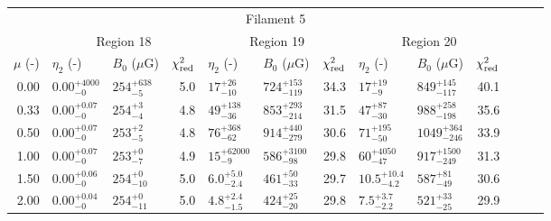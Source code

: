 \begin{tabular}{@{}r llr llr llr llr@{}}
\midrule
\multicolumn{13}{c}{Filament 5} \\
\cmidrule{1-13}
{} & \multicolumn{3}{c}{Region 18}
   & \multicolumn{3}{c}{Region 19}
   & \multicolumn{3}{c}{Region 20} \\
\cmidrule(lr){2-4} \cmidrule(lr){5-7} \cmidrule(lr){8-10}
$\mu$ (-) & $\eta_2$ (-) & $B_0$ ($\mu$G) & $\chi^2_{\mathrm{red}}$
          & $\eta_2$ (-) & $B_0$ ($\mu$G) & $\chi^2_{\mathrm{red}}$
          & $\eta_2$ (-) & $B_0$ ($\mu$G) & $\chi^2_{\mathrm{red}}$ \\
\cmidrule{1-10}
0.00 & ${0.00}^{+4000}_{-0}$ & ${254}^{+638}_{-5}$ & 5.0
     & ${17}^{+26}_{-10}$ & ${724}^{+153}_{-119}$ & 34.3
     & ${17}^{+19}_{-9}$ & ${849}^{+145}_{-117}$ & 40.1 \\
0.33 & ${0.00}^{+0.07}_{-0}$ & ${254}^{+3}_{-4}$ & 4.8
     & ${49}^{+138}_{-36}$ & ${853}^{+293}_{-214}$ & 31.5
     & ${47}^{+87}_{-30}$ & ${988}^{+258}_{-198}$ & 35.6 \\
0.50 & ${0.00}^{+0.07}_{-0}$ & ${253}^{+2}_{-5}$ & 4.8
     & ${76}^{+368}_{-62}$ & ${914}^{+440}_{-279}$ & 30.6
     & ${71}^{+195}_{-50}$ & ${1049}^{+364}_{-246}$ & 33.9 \\
1.00 & ${0.00}^{+0.07}_{-0}$ & ${253}^{+0}_{-7}$ & 4.9
     & ${15}^{+62000}_{-9}$ & ${586}^{+3100}_{-98}$ & 29.8
     & ${60}^{+4050}_{-47}$ & ${917}^{+1500}_{-249}$ & 31.3 \\
1.50 & ${0.00}^{+0.06}_{-0}$ & ${254}^{+0}_{-10}$ & 5.0
     & ${6.0}^{+5.0}_{-2.4}$ & ${461}^{+50}_{-33}$ & 29.7
     & ${10.5}^{+10.4}_{-4.2}$ & ${587}^{+81}_{-49}$ & 30.6 \\
2.00 & ${0.00}^{+0.04}_{-0}$ & ${254}^{+0}_{-11}$ & 5.0
     & ${4.8}^{+2.4}_{-1.5}$ & ${424}^{+25}_{-20}$ & 29.8
     & ${7.5}^{+3.7}_{-2.2}$ & ${521}^{+33}_{-25}$ & 29.9 \\

\bottomrule
\end{tabular}
